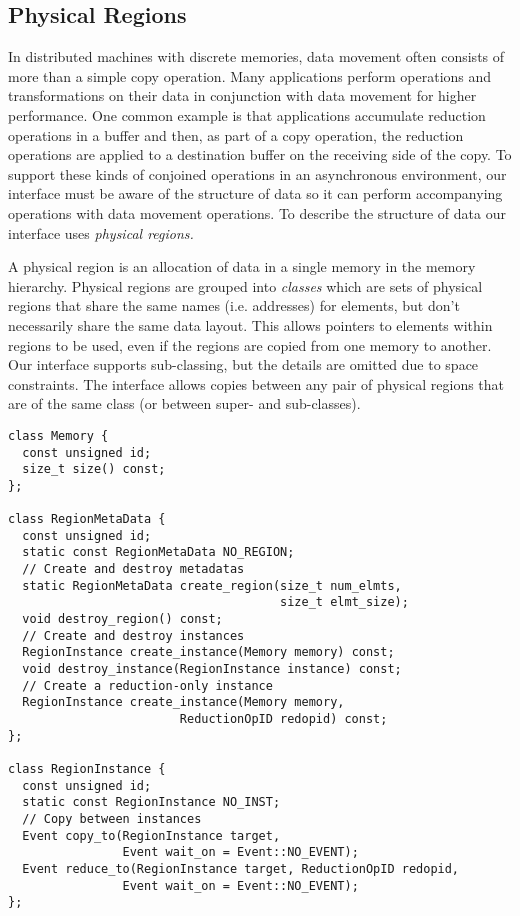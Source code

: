 \subsection{Physical Regions}
\label{subsec:phyreg}
In distributed machines with discrete memories, data movement often consists of more
than a simple copy operation.  Many applications perform operations and transformations on
their data in conjunction with data movement for higher performance.  One common example is 
that applications accumulate reduction operations in a buffer and then, as part of a copy operation,
the reduction operations are applied to a destination buffer on the receiving side of the copy.  
To support these kinds of conjoined operations in an asynchronous environment, our interface 
must be aware of the structure of data so it can perform accompanying operations with 
data movement operations.  To describe the structure of data our interface uses {\em physical regions.}

A physical region is an allocation of data in a single memory in the memory hierarchy.  Physical
regions are grouped into {\em classes} which are sets of physical regions that share the
same names (i.e. addresses) for elements, but don't necessarily share the same data layout.  This
allows pointers to elements within regions to be used, even if the regions are copied from one memory
to another.  Our
interface supports sub-classing, but the details are omitted due to space constraints.  The
interface allows copies between any pair of physical regions that are of
the same class (or between super- and sub-classes).  



\begin{lstlisting}[float={t},label={lst:regionapi},caption={Physical Region Interface and Example.}]
class Memory {
  const unsigned id;
  size_t size() const;
};

class RegionMetaData {
  const unsigned id;
  static const RegionMetaData NO_REGION;
  // Create and destroy metadatas
  static RegionMetaData create_region(size_t num_elmts, 
                                      size_t elmt_size);
  void destroy_region() const;
  // Create and destroy instances
  RegionInstance create_instance(Memory memory) const;
  void destroy_instance(RegionInstance instance) const;
  // Create a reduction-only instance
  RegionInstance create_instance(Memory memory, 
                        ReductionOpID redopid) const;
};

class RegionInstance {
  const unsigned id;
  static const RegionInstance NO_INST;
  // Copy between instances
  Event copy_to(RegionInstance target, 
                Event wait_on = Event::NO_EVENT);
  Event reduce_to(RegionInstance target, ReductionOpID redopid,
                Event wait_on = Event::NO_EVENT);
};
\end{lstlisting}

